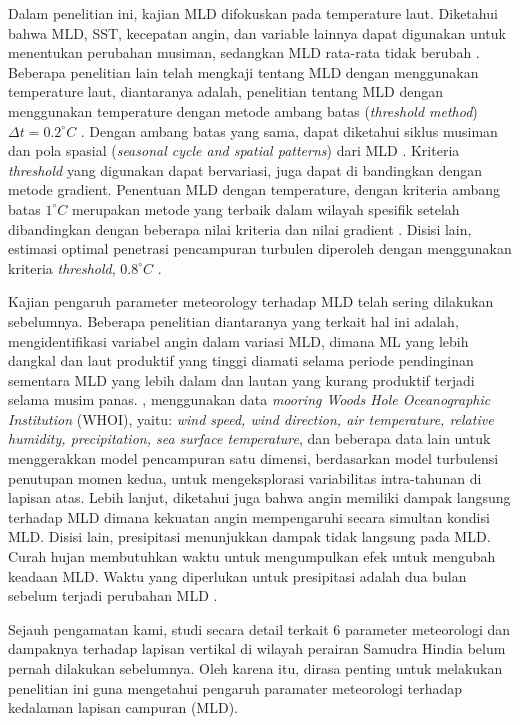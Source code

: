 \begin{spacing}{1.5}
	Dalam penelitian ini, kajian MLD difokuskan pada temperature laut. Diketahui bahwa MLD, SST, kecepatan angin, dan variable lainnya dapat digunakan untuk menentukan perubahan musiman, sedangkan MLD rata-rata tidak berubah . Beberapa penelitian lain telah mengkaji tentang MLD dengan menggunakan temperature laut, diantaranya adalah, penelitian tentang MLD dengan menggunakan temperature dengan metode ambang batas (\textit{threshold method}) $\Delta t=0.2^\circ C$ . Dengan ambang batas yang sama, dapat diketahui siklus musiman dan pola spasial (\textit{seasonal cycle and spatial patterns}) dari MLD . Kriteria \textit{threshold} yang digunakan dapat bervariasi, juga dapat di bandingkan dengan metode gradient. Penentuan MLD dengan temperature, dengan kriteria ambang batas  $1^\circ C$ merupakan metode yang terbaik dalam wilayah spesifik setelah dibandingkan dengan beberapa nilai kriteria dan nilai gradient . Disisi lain, estimasi optimal penetrasi pencampuran turbulen diperoleh dengan menggunakan kriteria \textit{threshold}, $0.8^\circ C$ .
	
	Kajian pengaruh parameter meteorology terhadap MLD telah sering dilakukan sebelumnya. Beberapa penelitian diantaranya yang terkait hal ini adalah,  mengidentifikasi variabel angin dalam variasi MLD, dimana ML yang lebih dangkal dan laut produktif yang tinggi diamati selama periode pendinginan sementara MLD yang lebih dalam dan lautan yang kurang produktif terjadi selama musim panas. , menggunakan data \textit{mooring Woods Hole Oceanographic Institution} (WHOI), yaitu: \textit{wind speed, wind direction, air temperature, relative humidity, precipitation, sea surface temperature}, dan beberapa data lain untuk menggerakkan model pencampuran satu dimensi, berdasarkan model turbulensi penutupan momen kedua, untuk mengeksplorasi variabilitas intra-tahunan di lapisan atas. Lebih lanjut, diketahui juga bahwa angin memiliki dampak langsung terhadap MLD dimana kekuatan angin mempengaruhi secara simultan kondisi MLD. Disisi lain, presipitasi menunjukkan dampak tidak langsung pada MLD. Curah hujan membutuhkan waktu untuk mengumpulkan efek untuk mengubah keadaan MLD. Waktu yang diperlukan untuk presipitasi adalah dua bulan sebelum terjadi perubahan MLD . 
	
	Sejauh pengamatan kami, studi secara detail terkait 6 parameter meteorologi dan dampaknya terhadap lapisan vertikal di wilayah perairan Samudra Hindia belum pernah dilakukan sebelumnya. Oleh karena itu, dirasa penting untuk melakukan penelitian ini guna mengetahui pengaruh paramater meteorologi terhadap kedalaman lapisan campuran (MLD).


\end{spacing}
